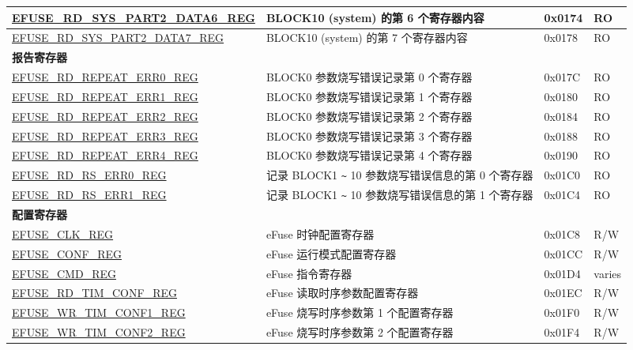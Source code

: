 \begin{longtable}{ | p{6.8cm} | p{7cm} | p{1.3cm} | p{1.2cm} | }
\hyperref[regdesc:EFUSERDSYSPART2DATA6REG]{EFUSE\_RD\_SYS\_PART2\_DATA6\_REG} & BLOCK10 (system) 的第 6 个寄存器内容 & 0x0174 & RO \\ \hline
\hyperref[regdesc:EFUSERDSYSPART2DATA7REG]{EFUSE\_RD\_SYS\_PART2\_DATA7\_REG} & BLOCK10 (system) 的第 7 个寄存器内容 & 0x0178 & RO \\ \hline
\multicolumn{4}{|l|}{\textbf{报告寄存器}} \\ \hline
\hyperref[regdesc:EFUSERDREPEATERR0REG]{EFUSE\_RD\_REPEAT\_ERR0\_REG} & BLOCK0 参数烧写错误记录第 0 个寄存器 & 0x017C & RO \\ \hline
\hyperref[regdesc:EFUSERDREPEATERR1REG]{EFUSE\_RD\_REPEAT\_ERR1\_REG} & BLOCK0 参数烧写错误记录第 1 个寄存器 & 0x0180 & RO \\ \hline
\hyperref[regdesc:EFUSERDREPEATERR2REG]{EFUSE\_RD\_REPEAT\_ERR2\_REG} & BLOCK0 参数烧写错误记录第 2 个寄存器 & 0x0184 & RO \\ \hline
\hyperref[regdesc:EFUSERDREPEATERR3REG]{EFUSE\_RD\_REPEAT\_ERR3\_REG} & BLOCK0 参数烧写错误记录第 3 个寄存器 & 0x0188 & RO \\ \hline
\hyperref[regdesc:EFUSERDREPEATERR4REG]{EFUSE\_RD\_REPEAT\_ERR4\_REG} & BLOCK0 参数烧写错误记录第 4 个寄存器 & 0x0190 & RO \\ \hline
\hyperref[regdesc:EFUSERDRSERR0REG]{EFUSE\_RD\_RS\_ERR0\_REG} & 记录 BLOCK1 \verb+~+ 10 参数烧写错误信息的第 0 个寄存器 & 0x01C0 & RO \\ \hline
\hyperref[regdesc:EFUSERDRSERR1REG]{EFUSE\_RD\_RS\_ERR1\_REG} & 记录 BLOCK1 \verb+~+ 10 参数烧写错误信息的第 1 个寄存器 & 0x01C4 & RO \\ \hline
\multicolumn{4}{|l|}{\textbf{配置寄存器}} \\ \hline
\hyperref[regdesc:EFUSECLKREG]{EFUSE\_CLK\_REG} & eFuse 时钟配置寄存器 & 0x01C8 & R/W \\ \hline
\hyperref[regdesc:EFUSECONFREG]{EFUSE\_CONF\_REG} & eFuse 运行模式配置寄存器 & 0x01CC & R/W \\ \hline
\hyperref[regdesc:EFUSECMDREG]{EFUSE\_CMD\_REG} & eFuse 指令寄存器 & 0x01D4 & varies \\ \hline
\hyperref[regdesc:EFUSERDTIMCONFREG]{EFUSE\_RD\_TIM\_CONF\_REG} & eFuse 读取时序参数配置寄存器 & 0x01EC & R/W \\ \hline
\hyperref[regdesc:EFUSEWRTIMCONF1REG]{EFUSE\_WR\_TIM\_CONF1\_REG} & eFuse 烧写时序参数第 1 个配置寄存器 & 0x01F0 & R/W \\ \hline
\hyperref[regdesc:EFUSEWRTIMCONF2REG]{EFUSE\_WR\_TIM\_CONF2\_REG} & eFuse 烧写时序参数第 2 个配置寄存器 & 0x01F4 & R/W \\ \hline

\end{longtable}
